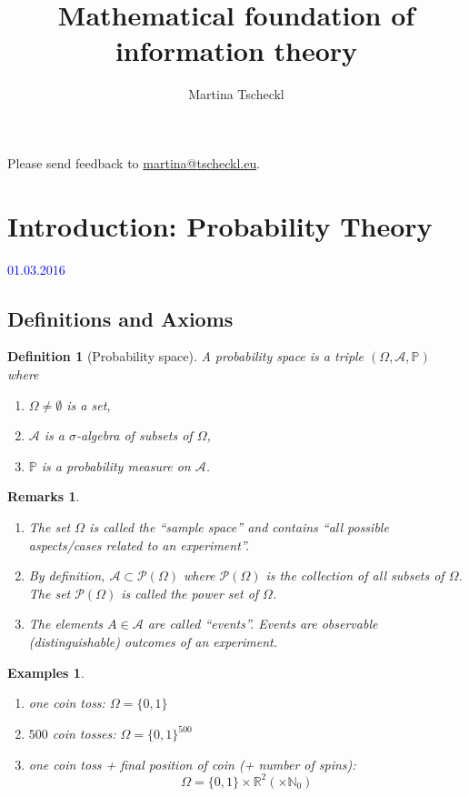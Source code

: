 \documentclass[a4paper]{article}
\author{Martina Tscheckl}
\title{Mathematical foundation of information theory}
\newcommand{\lecture}{\vspace{5mm}\textcolor{blue}}
\newtheorem*{defi*}{Definition}
\newtheorem*{rems*}{Remarks}
\newtheorem*{exs}{Examples}
\newcommand{\N}{\mathbb{N}}
\newcommand{\PP}{\mathbb{P}}
\newcommand{\R}{\mathbb{R}}
\begin{document}
\maketitle
Please send feedback to \url{martina@tscheckl.eu}.
\tableofcontents


\section{Introduction: Probability Theory}
\lecture{01.03.2016}

\subsection{Definitions and Axioms}

\begin{defi*}[Probability space]
  A \emph{probability space} is a triple $(\Omega,\mathcal{A},\PP)$ where 
  \begin{enumerate}
    \item $\Omega \neq \emptyset$ is a \emph{set},
    \item $\mathcal{A}$ is a \emph{$\sigma$-algebra} of subsets of $\Omega$,
    \item $\PP$ is a \emph{probability measure} on $\mathcal{A}$.
  \end{enumerate}
\end{defi*}

\begin{rems*}
  \begin{enumerate}[label=(\alph*)]
    \item The set $\Omega$ is called the \enquote{sample space} and contains \enquote{all possible aspects/cases related to an experiment}.
    \item By definition, $\mathcal{A} \subset \mathcal{P}(\Omega)$ where $\mathcal{P}(\Omega)$ is the collection of all subsets of $\Omega$. The set $\mathcal{P}(\Omega)$ is called the power set of $\Omega$.
    \item The elements $A \in \mathcal{A}$ are called \enquote{events}. 
    Events are observable (distinguishable) outcomes of an experiment.
  \end{enumerate}
\end{rems*}

\begin{exs}
  \begin{enumerate}[label=(\alph*)]
    \item one coin toss: $\Omega = \{ 0,1 \}$
    \item $500$ coin tosses: $\Omega = \{0,1 \}^{500}$
    \item one coin toss + final position of coin (+ number of spins):
    \[ \Omega = \{ 0,1 \} \times \R^2 ( \times \N_0 ) \]
  \end{enumerate}
\end{exs}
\end{document}

